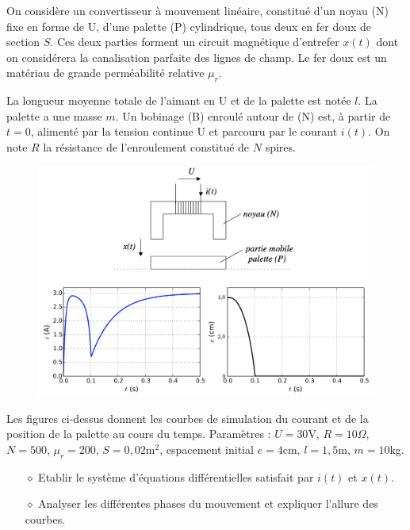\documentclass{report}
\begin{document}
On considère un convertisseur à mouvement linéaire, constitué d’un noyau (N) fixe en forme de U, d’une palette (P) cylindrique, tous deux en fer doux de section $S$. Ces deux parties forment un circuit magnétique d’entrefer $x(t)$ dont on considérera la canalisation parfaite des lignes de champ. Le fer doux est un matériau de grande perméabilité relative $\mu_r$.

La longueur moyenne totale de l’aimant en U et de la palette est notée $l$. La palette a une masse $m$.
Un bobinage (B) enroulé autour de (N) est, à partir de $t = 0$, alimenté par la tension continue U et parcouru par le courant $i(t)$. On note $R$ la résistance de l’enroulement constitué de $N$ spires.

\begin{figure}[h!]
	\centering
		\includegraphics[scale=0.6]{relais.png}
\end{figure}		

Les figures ci-dessus donnent les courbes de simulation du courant et de la position de la palette au cours du temps. Paramètres : $U=30$V, $R=10\Omega$, $N=500$, $\mu_r=200$, $S=0,02$m$^2$, espacement initial $e=4$cm, $l=1,5$m, $m=10$kg.

\begin{itemize}
	
	\item[$\diamond$] Etablir le système d'équations différentielles satisfait par $i(t)$ et $x(t)$.
	
	\item[$\diamond$] Analyser les différentes phases du mouvement et expliquer l'allure des courbes.
	
\end{itemize}
\end{document}
